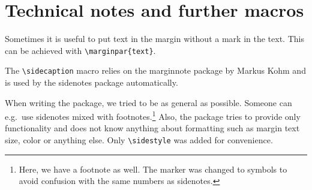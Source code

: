 \documentclass{book}
\begin{document}
\section{Technical notes and further macros} 
Sometimes it is useful to put text in the margin without a mark in the text. This can be achieved with \verb+\marginpar{text}+. 

The \verb+\sidecaption+ macro relies on the marginnote package by Markus Kohm and is used by the sidenotes package automatically.

When writing the package, we tried to be as general as possible. Someone can e.g.\ use sidenotes mixed with footnotes.\footnote{Here, we have a footnote as well. The marker was changed to symbols to avoid confusion with the same numbers as sidenotes.} Also, the package tries to provide only functionality and does not know anything about formatting such as margin text size, color or anything else. Only \verb+\sidestyle+ was added for convenience. 
\end{document}

